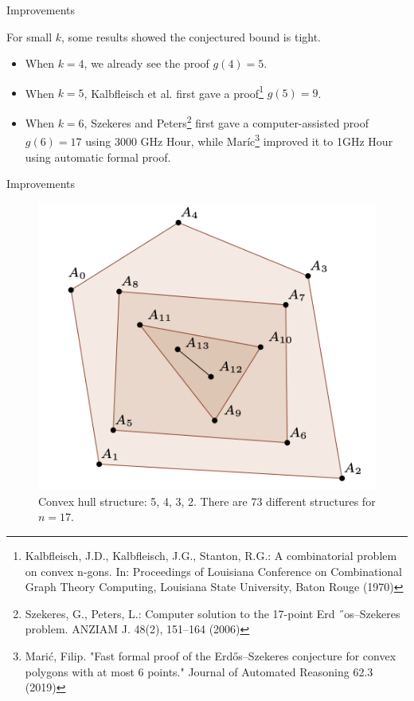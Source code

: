 \documentclass{beamer}
\begin{document}
\begin{frame}{Improvements}

	For small $k$, some results showed the conjectured bound is tight.

	\begin{itemize}
		\item
		      When $k=4$, we already see the proof $g(4) = 5$.
		\item
		      When $k=5$, Kalbfleisch et al. first gave a proof\footnote{Kalbfleisch, J.D., Kalbfleisch, J.G., Stanton, R.G.: A combinatorial problem on convex n-gons. In:
			      Proceedings of Louisiana Conference on Combinational Graph Theory Computing, Louisiana State University, Baton Rouge (1970)} $g(5) = 9$.
		\item
		      When $k=6$, Szekeres and Peters\footnote{Szekeres, G., Peters, L.: Computer solution to the 17-point Erd ˝os–Szekeres problem. ANZIAM J. 48(2),
			      151–164 (2006)} first gave a computer-assisted proof $g(6) = 17$  using 3000 GHz Hour, while Mar\'ic\footnote{Marić, Filip. "Fast formal proof of the Erdős–Szekeres conjecture for convex polygons with at most 6 points." Journal of Automated Reasoning 62.3 (2019)} improved it to 1GHz Hour using automatic formal proof.
	\end{itemize}


\end{frame}

\begin{frame}{Improvements}

	\begin{figure}[r]
		\includegraphics[width=0.7\linewidth]{convex_hull_struct.png}
		\caption{Convex hull structure: 5, 4, 3, 2.  There are 73 different structures for $n=17$.}
		\label{figstruct}
	\end{figure}

\end{frame}
\end{document}
